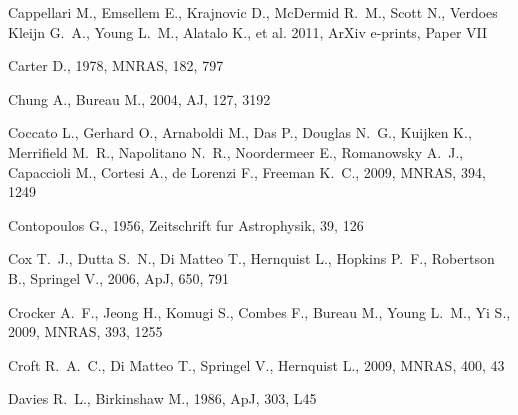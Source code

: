 \documentclass[usenatbib,usegraphicx]{mn2e}
\def\aj{AJ}             %
\def\apj{ApJ}           %
\def\apjl{ApJ}          %
\def\mnras{MNRAS}       %
\begin{document}
\begin{thebibliography}{}
{Cappellari} M.,  {Emsellem} E.,  {Krajnovic} D.,  {McDermid} R.~M.,  {Scott}
  N.,  {Verdoes Kleijn} G.~A.,  {Young} L.~M.,  {Alatalo} K.,    {et al.} 2011,
  ArXiv e-prints, Paper VII

{Carter} D.,  1978, \mnras, 182, 797

{Chung} A.,  {Bureau} M.,  2004, \aj, 127, 3192

{Coccato} L.,  {Gerhard} O.,  {Arnaboldi} M.,  {Das} P.,  {Douglas} N.~G.,
  {Kuijken} K.,  {Merrifield} M.~R.,  {Napolitano} N.~R.,  {Noordermeer} E.,
  {Romanowsky} A.~J.,  {Capaccioli} M.,  {Cortesi} A.,  {de Lorenzi} F.,
  {Freeman} K.~C.,  2009, \mnras, 394, 1249

{Contopoulos} G.,  1956, Zeitschrift fur Astrophysik, 39, 126

{Cox} T.~J.,  {Dutta} S.~N.,  {Di Matteo} T.,  {Hernquist} L.,  {Hopkins}
  P.~F.,  {Robertson} B.,    {Springel} V.,  2006, \apj, 650, 791

{Crocker} A.~F.,  {Jeong} H.,  {Komugi} S.,  {Combes} F.,  {Bureau} M.,
  {Young} L.~M.,    {Yi} S.,  2009, \mnras, 393, 1255

{Croft} R.~A.~C.,  {Di Matteo} T.,  {Springel} V.,    {Hernquist} L.,  2009,
  \mnras, 400, 43

{Davies} R.~L.,  {Birkinshaw} M.,  1986, \apjl, 303, L45


\end{thebibliography}
\end{document}
